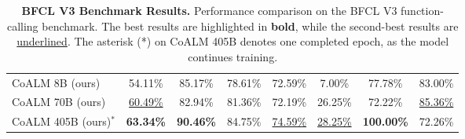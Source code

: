 \begin{table*}[!t]
{\begin{tabular}{l c c c c c c c }
CoALM 8B (ours)                  & 54.11\%                & 85.17\%                   & 78.61\%                     & 72.59\%              & 7.00\%                   & 77.78\%                      & 83.00\%                        \\ 
CoALM 70B (ours)                 & \underline{60.49\%}    & 82.94\%                   & 81.36\%                     & 72.19\%              & 26.25\%                  & 72.22\%                      & \underline{85.36\%}            \\ 
CoALM 405B (ours)\textbf{$^*$}                & \textbf{63.34\%}       & \textbf{90.46\%}          & 84.75\%                     & \underline{74.59\%}  & \underline{28.25\%}      & \textbf{100.00\%}            & 72.26\%                        \\ 
 \bottomrule
\end{tabular}
}
\caption{\textbf{BFCL V3 Benchmark Results.} Performance comparison on the BFCL V3 function-calling benchmark. The best results are highlighted in \textbf{bold}, while the second-best results are \underline{underlined}. The asterisk (*) on CoALM 405B denotes one completed epoch, as the model continues training.}
\label{tab:bfcl}
\end{table*}


